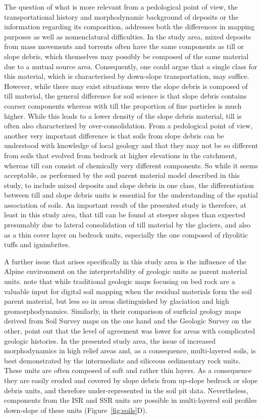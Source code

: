\documentclass[preprint,12pt,authoryear]{elsarticle}
\begin{document}
The question of what is more relevant from a pedological point of view,  the transportational history and morphodynamic background of deposits  or the information regarding its composition, addresses both the differences in mapping purposes as well as nomenclatural difficulties. In the study area, mixed deposits from mass movements and torrents often have the same components as till or slope debris, which themselves may possibly be composed of the same material due to a mutual source area. Consequently, one could argue that a single class for this material, which is characterised by down-slope transportation, may suffice. However, while there may exist situations were the slope debris is composed of till material, the general difference for soil science is that slope debris contains coarser components whereas with till the proportion of fine particles is much higher. While this leads to a lower density of the slope debris material, till is often also characterized by over-consolidation. From a pedological point of view, another very important difference is that soils from slope debris can be understood with knowledge of local geology and that they may not be so different from soils  that evolved from bedrock at higher elevations in the catchment, whereas till can consist of chemically very different components. So while it seems acceptable, as performed by the soil parent material model described in this study, to include mixed deposits and slope debris in one class, the differentiation between till and slope debris units is essential for the understanding of the spatial association of soils. An important result of the presented study is therefore, at least in this study area, that till can be found at steeper slopes than expected presumably due to lateral consolidation of till material by the glaciers, and also as a thin cover layer  on bedrock units, especially the one composed of rhyolitic tuffs and ignimbrites.

A further issue that arises specifically in this study area is the influence of the Alpine environment on the interpretability of geologic units as parent material units. \cite{Heung2014} note that while traditional geologic maps focusing on bed rock are a valuable input for digital soil mapping when the residual materials form the soil parent material, but less so in areas distinguished by glaciation and high geomorphodynamics. Similarly, in their comparison of surficial geology maps derived from Soil Survey maps on the one hand and the Geologic Survey on the other, \cite{Miller2015a} point out that the level of agreement was lower for areas with complicated geologic histories. In the presented study area, the  issue of increased morphodynamics in high relief areas and, as a consequence, multi-layered soils, is best demonstrated by the intermediate and siliceous sedimentary rock units. These units are often composed of soft and rather thin layers. As a consequence they are easily eroded and covered by slope debris from up-slope bedrock or slope debris units, and therefore under-represented in the soil pit data. Nevertheless, components from the ISR and SSR units are possible in multi-layered soil profiles down-slope of these units (Figure~\ref{fig:soils}D).
\end{document}
